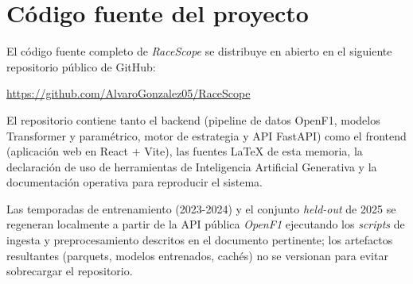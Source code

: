 
\chapter{Código fuente del proyecto}
\label{ann:repo}

El código fuente completo de \textit{RaceScope} se distribuye en abierto en el siguiente repositorio público de GitHub:

\begin{center}
\url{https://github.com/AlvaroGonzalez05/RaceScope}
\end{center}

\noindent
El repositorio contiene tanto el backend (pipeline de datos OpenF1, modelos Transformer y paramétrico, motor de estrategia y API FastAPI) como el frontend (aplicación web en React + Vite), las fuentes \LaTeX{} de esta memoria, la declaración de uso de herramientas de Inteligencia Artificial Generativa y la documentación operativa para reproducir el sistema.

\noindent
Las temporadas de entrenamiento (2023-2024) y el conjunto \textit{held-out} de 2025 se regeneran localmente a partir de la API pública \textit{OpenF1} ejecutando los \textit{scripts} de ingesta y preprocesamiento descritos en el documento pertinente; los artefactos resultantes (parquets, modelos entrenados, cachés) no se versionan para evitar sobrecargar el repositorio.

